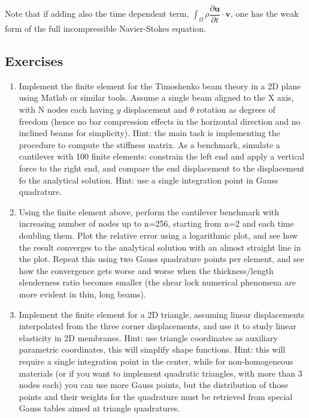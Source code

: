\documentclass{digitaldynamics}
\begin{document}
\begin{itemize}
	Note that if adding also the time dependent term, $\displaystyle \int_{\Omega}\rho \dfrac{\partial \boldsymbol u}{\partial t}\cdot \boldsymbol v$, one has the weak form of the full incompressible Navier-Stokes equation.
	
	
\end{itemize}



\subsection{Exercises}

{
\small

\begin{enumerate}
	
	\item Implement the finite element for the Timoshenko beam theory in a 2D plane using Matlab or similar tools.  Assume a single beam aligned to the X axis, with N nodes each having $y$ displacement and $\theta$ rotation as degrees of freedom (hence no bar compression effects in the horizontal direction and no inclined beams for simplicity). Hint: the main task is implementing the procedure to compute the stiffness matrix. As a benchmark, simulate a cantilever with 100 finite elements: constrain the left end and apply a vertical force to the right end, and compare the end displacement to the displacement fo the analytical solution. Hint: use a single integration point in Gauss quadrature.
	
	\item Using the finite element above, perform the cantilever benchmark with increasing number of nodes up to n=256, starting from n=2 and each time doubling them. Plot the relative error using a logarithmic plot, and see how the result converges to the analytical solution with an almost straight line in the plot. Repeat this using two Gauss quadrature points per element, and see how the convergence gets worse and worse when the thickness/length slenderness ratio becomes smaller (the shear lock numerical phenomena are more evident in thin, long beams).	
	
	\item Implement the finite element for a 2D triangle, assuming linear displacements interpolated from the three corner displacements, and use it to study linear elasticity in 2D membranes. Hint: use triangle coordinates as auxiliary parametric coordinates, this will simplify shape functions. Hint: this will require a single integration point in the center, while for non-homogeneous materials (or if you want to implement quadratic triangles, with more than 3 nodes each) you can use more Gauss points, but the distribution of those points and their weights for the quadrature must be retrieved from special Gauss tables aimed at triangle quadratures.
	
\end{enumerate}

}
\end{document}
